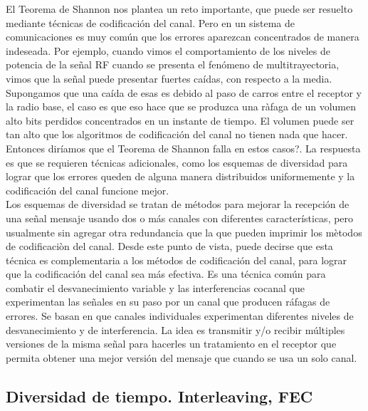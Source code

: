 El Teorema de Shannon nos plantea un reto importante, que puede ser resuelto mediante técnicas de codificación del canal. Pero en un sistema de comunicaciones es muy común que los errores aparezcan concentrados de manera indeseada. Por ejemplo, cuando vimos el comportamiento de los niveles de potencia de la señal RF cuando se presenta el fenómeno de multitrayectoria, vimos que la señal puede presentar fuertes caídas, con respecto a la media. Supongamos que una caída de esas es debido al paso de carros entre el receptor y la radio base, el caso es que eso hace que se produzca una ràfaga de un volumen alto bits perdidos concentrados en un instante de tiempo. El volumen puede ser tan alto que los algoritmos de codificación del canal no tienen nada que hacer. Entonces diríamos que el Teorema de Shannon falla en estos casos?. La respuesta es que se requieren técnicas adicionales, como los esquemas de diversidad para lograr que los errores queden de alguna manera distribuidos uniformemente y la codificación del canal funcione mejor. \\

Los esquemas de diversidad se tratan de métodos para mejorar la recepción de una señal mensaje usando dos o más canales con diferentes características, pero usualmente sin agregar otra redundancia que la que pueden imprimir los mètodos de codificaciòn del canal. Desde este punto de vista, puede decirse que esta técnica es complementaria a los métodos de codificación del canal, para lograr que la codificación del canal sea más efectiva. Es una técnica común para combatir el desvanecimiento variable y las interferencias cocanal que experimentan las señales en su paso por un canal que producen ráfagas de errores. Se basan en que canales individuales experimentan diferentes niveles de desvanecimiento y de interferencia. La idea es transmitir y/o recibir múltiples versiones de la misma señal para hacerles un tratamiento en el receptor que permita obtener una mejor versión del mensaje que cuando se usa un solo canal. \\

\subsection{Diversidad de tiempo. Interleaving, FEC}

